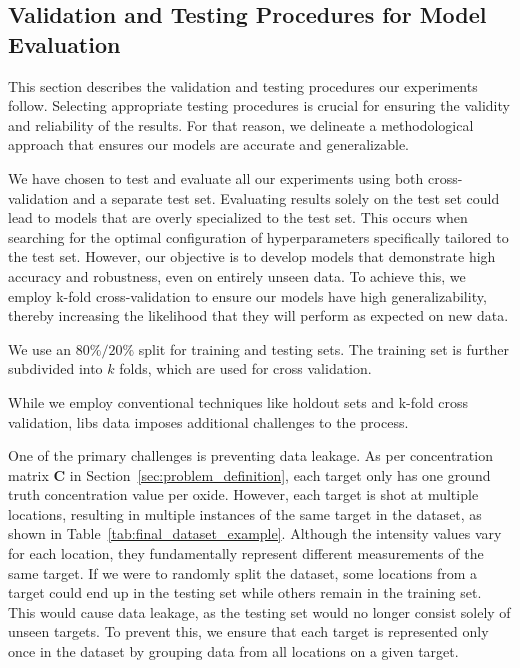 \subsection{Validation and Testing Procedures for Model Evaluation}\label{subsec:validation_testing_procedures}
This section describes the validation and testing procedures our experiments follow.
Selecting appropriate testing procedures is crucial for ensuring the validity and reliability of the results.
For that reason, we delineate a methodological approach that ensures our models are accurate and generalizable.

We have chosen to test and evaluate all our experiments using both cross-validation and a separate test set.
Evaluating results solely on the test set could lead to models that are overly specialized to the test set.
This occurs when searching for the optimal configuration of hyperparameters specifically tailored to the test set.
However, our objective is to develop models that demonstrate high accuracy and robustness, even on entirely unseen data.
To achieve this, we employ k-fold cross-validation to ensure our models have high generalizability, thereby increasing the likelihood that they will perform as expected on new data.

We use an $80\%/20\%$ split for training and testing sets. The training set is further subdivided into $k$ folds, which are used for cross validation.

While we employ conventional techniques like holdout sets and k-fold cross validation, \gls{libs} data imposes additional challenges to the process.

One of the primary challenges is preventing data leakage.
As per concentration matrix $\mathbf{C}$ in Section~\ref{sec:problem_definition}, each target only has one ground truth concentration value per oxide.
However, each target is shot at multiple locations, resulting in multiple instances of the same target in the dataset, as shown in Table~\ref{tab:final_dataset_example}.
Although the intensity values vary for each location, they fundamentally represent different measurements of the same target.
If we were to randomly split the dataset, some locations from a target could end up in the testing set while others remain in the training set.
This would cause data leakage, as the testing set would no longer consist solely of unseen targets.
To prevent this, we ensure that each target is represented only once in the dataset by grouping data from all locations on a given target.

